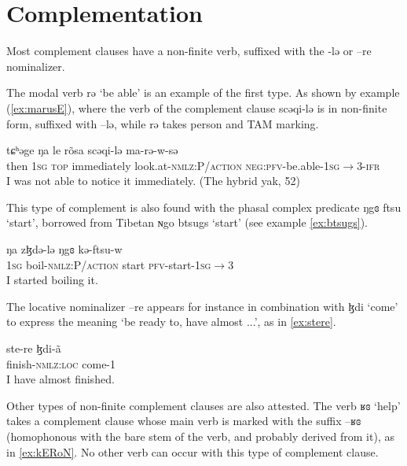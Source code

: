 \documentclass[oneside,a4paper,11pt]{article}
\newcommand{\ipa}[1]{{\phon #1}} %
\begin{document}
 
 

\section{Complementation}  
Most complement clauses have a non-finite verb, suffixed with the \ipa{-lə} or \ipa{--re} nominalizer.

The modal verb \ipa{rə} `be able' is an example of the first type. As shown by example (\ref{ex:marusE}), where the verb of the complement clause \ipa{scəqi-lə}  is in non-finite form, suffixed with \ipa{--lə}, while \ipa{rə} takes person and TAM marking.

\begin{exe}
\ex\label{ex:marusE}
\gll
\ipa{tɕʰəge} 	\ipa{ŋa} 	\ipa{le} 	\ipa{rõsa} 	\ipa{scəqi-lə} 	\ipa{ma-rə-w-sə} \\
then \textsc{1sg} \textsc{top} immediately look.at-\textsc{nmlz:P/action} \textsc{neg:pfv}-be.able-\textsc{1sg}$\rightarrow$3-\textsc{ifr} \\
\glt I was not able to notice it immediately. (The hybrid yak, 52)
\end{exe}

This type of complement is also found with the phasal complex predicate \ipa{ŋgɞ} \ipa{ftsu} `start', borrowed from Tibetan \ipa{ɴgo btsugs} `start' (see example \ref{ex:btsugs}).

\begin{exe}
\ex \label{ex:btsugs}
\gll 
\ipa{ŋa} 	\ipa{zɮdə-lə} 	\ipa{ŋgɞ} 	\ipa{kə-ftsu-w} \\
\textsc{1sg} boil-\textsc{nmlz:P/action} start \textsc{pfv}-start-\textsc{1sg}$\rightarrow$3 \\
\glt I started boiling it.
\end{exe}

The locative nominalizer \ipa{--re} appears for instance in combination with \ipa{ɮdi} `come' to express the meaning `be ready to, have almost ...', as in \ref{ex:stere}.

\begin{exe}
\ex \label{ex:stere}
\gll 
 \ipa{ste-re} 	\ipa{ɮdi-ã} \\
finish-\textsc{nmlz:loc} come-1 \\
\glt I have almost finished.
\end{exe}



Other types of non-finite complement clauses are also attested. The verb \ipa{ʁɞ} `help' takes a complement clause  whose main verb is marked with the suffix \ipa{--ʁɞ} (homophonous with the bare stem of the verb, and probably derived from it), as in \ref{ex:kERoN}. No other verb can occur with this type of complement clause.
\end{document}
